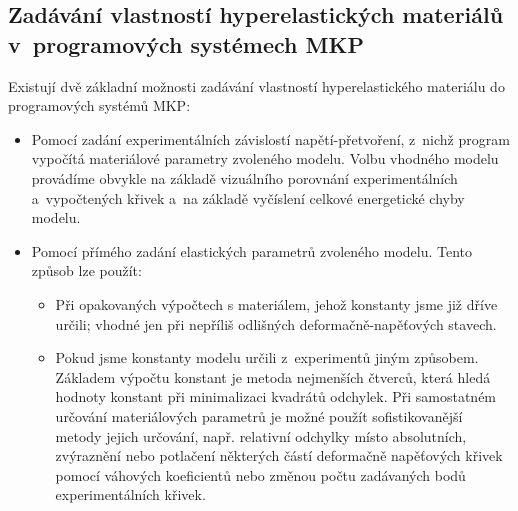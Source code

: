 \subsection{Zadávání vlastností hyperelastických materiálů v~programových systémech MKP}
Existují dvě základní možnosti zadávání vlastností hyperelastického materiálu do programových systémů MKP:
\begin{itemize}
	\item Pomocí zadání experimentálních závislostí napětí-přetvoření, z~nichž program vypočítá materiálové parametry zvoleného modelu. Volbu vhodného modelu provádíme obvykle na základě vizuálního porovnání experimentálních a~vypočtených křivek a~na základě vyčíslení celkové energetické chyby modelu.
	\item Pomocí přímého zadání elastických parametrů zvoleného modelu. Tento způsob lze použít:
	\begin{itemize}
		\item Při opakovaných výpočtech s materiálem, jehož konstanty jsme již dříve určili; vhodné jen při nepříliš odlišných deformačně-napěťových stavech.
		\item Pokud jsme konstanty modelu určili z~experimentů jiným způsobem. Základem výpočtu konstant je metoda nejmenších čtverců, která hledá hodnoty konstant při minimalizaci kvadrátů odchylek. Při samostatném určování materiálových parametrů je možné použít sofistikovanější metody jejich určování, např. relativní odchylky místo absolutních, zvýraznění nebo potlačení některých částí deformačně napěťových křivek pomocí váhových koeficientů nebo změnou počtu zadávaných bodů experimentálních křivek.
	\end{itemize}
\end{itemize}

